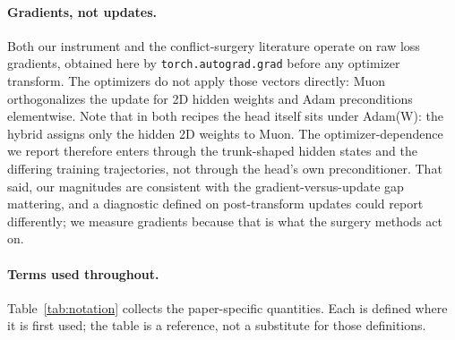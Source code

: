 \paragraph{Gradients, not updates.} Both our instrument and the conflict-surgery
literature operate on raw loss gradients, obtained here by
\texttt{torch.autograd.grad} before any optimizer transform. The optimizers do not
apply those vectors directly: Muon orthogonalizes the update for 2D hidden weights
and Adam preconditions elementwise. Note that in both recipes the head itself sits
under Adam(W): the hybrid assigns only the hidden 2D weights to Muon. The
optimizer-dependence we report therefore enters through the trunk-shaped hidden states
and the differing training trajectories, not through the head's own preconditioner.
That said, our magnitudes are consistent with the gradient-versus-update gap mattering, and a diagnostic defined on post-transform updates could
report differently; we measure gradients because that is what the surgery methods act
on.

\paragraph{Terms used throughout.} Table~\ref{tab:notation} collects the
paper-specific quantities. Each is defined where it is first used; the table is a
reference, not a substitute for those definitions.

